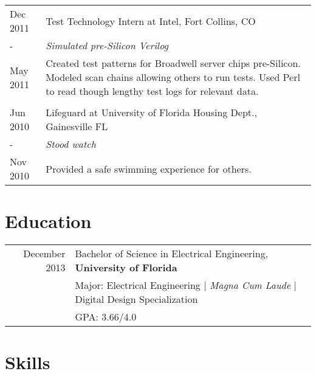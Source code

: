 \documentclass[a4paper,10pt]{article} %
\begin{document}
\begin{tabular}{p{1.6cm}|p{12.4cm}}

\centering Dec 2011 & Test Technology Intern at Intel, Fort Collins, CO \emph{}\\
\centering - & \emph{Simulated pre-Silicon Verilog}\\
\centering May 2011&\footnotesize{Created test patterns for Broadwell server chips pre-Silicon. Modeled scan chains allowing others to run tests. Used Perl to read though lengthy test logs for relevant data.}\\
\multicolumn{2}{c}{} \\


\centering Jun 2010 & Lifeguard at University of Florida Housing Dept., Gainesville FL \\
\centering - & \emph{Stood watch}\\
\centering Nov 2010& \footnotesize{Provided a safe swimming experience for others.}\\
\end{tabular}


\section{Education}

\begin{tabular}{rl}
December 2013 & Bachelor of Science in Electrical Engineering, \textbf{University of Florida}\\
& \small{Major: Electrical Engineering  | \emph{Magna Cum Laude}  |  Digital Design Specialization}\\
&\normalsize GPA: 3.66/4.0\\


\end{tabular}


\section{Skills}
\end{document}
